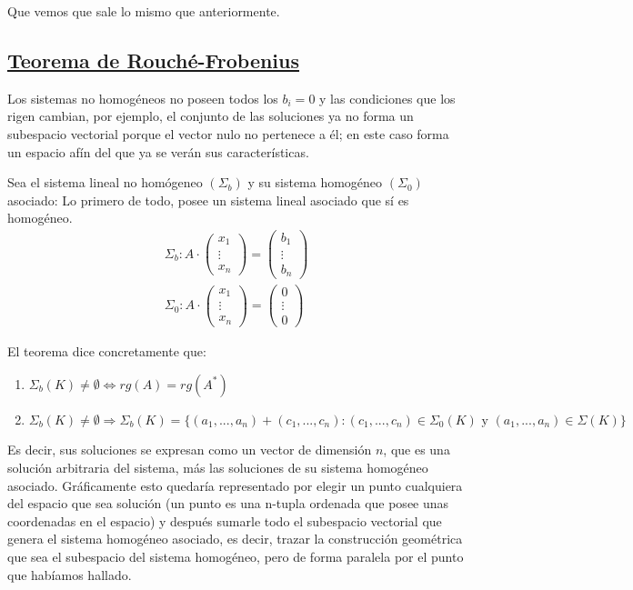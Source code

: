\documentclass[10pt,a4paper,openright]{book}
\begin{document}
Que vemos que sale lo mismo que anteriormente.

\subsection*{\underline{Teorema de Rouché-Frobenius}}
Los sistemas no homogéneos no poseen todos los $b_i=0$ y las condiciones que los rigen cambian, por ejemplo, el conjunto de las soluciones ya no forma un subespacio vectorial porque el vector nulo no pertenece a él; en este caso forma un espacio afín del que ya se verán sus características.\par
Sea el sistema lineal no homógeneo $(\Sigma_b)$ y su sistema homogéneo $(\Sigma_0)$ asociado:
Lo primero de todo, posee un sistema lineal asociado que sí es homogéneo.
\begin{gather*}
\Sigma_b: A\cdot \begin{pmatrix}
x_1 \\ \vdots \\ x_n
\end{pmatrix}=\begin{pmatrix}
b_1 \\ \vdots \\ b_n
\end{pmatrix} \\
\Sigma_0: A\cdot \begin{pmatrix}
x_1 \\ \vdots \\ x_n
\end{pmatrix}=\begin{pmatrix}
0 \\ \vdots \\ 0
\end{pmatrix} 
\end{gather*}

El teorema dice concretamente que:
\begin{enumerate}
\item $\Sigma_b(K)\neq \emptyset\Leftrightarrow rg(A)=rg(A^*) $
\item $\Sigma_b(K)\neq \emptyset\Rightarrow \Sigma_b(K)=\{(a_1, ..., a_n)+(c_1, ..., c_n): (c_1,... ,c_n)\in \Sigma_0(K) \mbox{ y }(a_1,...,a_n)\in \Sigma(K)\}$
\end{enumerate}
Es decir, sus soluciones se expresan como un vector de dimensión $n$, que es una solución arbitraria del sistema, más las soluciones de su sistema homogéneo asociado.
Gráficamente esto quedaría representado por elegir un punto cualquiera del espacio que sea solución (un punto es una n-tupla ordenada que posee unas coordenadas en el espacio) y después sumarle todo el subespacio vectorial que genera el sistema homogéneo asociado, es decir, trazar la construcción geométrica que sea el subespacio del sistema homogéneo, pero de forma paralela por el punto que habíamos hallado.
\end{document}
